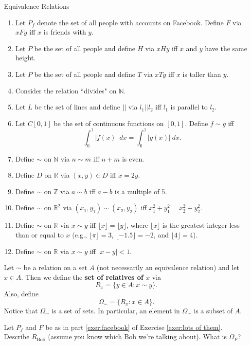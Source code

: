 \begin{section}{Equivalence Relations}
\begin{problem}
\begin{enumerate}\label{exer:lots of them}
\item\label{exer:facebook} Let $P_f$ denote the set of all people with accounts on Facebook.  Define  $F$ via $xFy$ iff $x$ is friends with $y$. 
\item Let $P$ be the set of all people and define $H$ via $xHy$ iff $x$ and $y$ have the same height.
\item Let $P$ be the set of all people and define $T$ via $xTy$ iff $x$ is taller than $y$.
\item Consider the relation ``divides" on $\mathbb{N}$.
\item Let $L$ be the set of lines and define $||$ via $l_1||l_2$ iff $l_1$ is parallel to $l_2$.
\item Let $C[0,1]$ be the set of continuous functions on $[0,1]$.  Define $f\sim g$ iff
\[
\int_0^1|f(x)|\ dx=\int_0^1|g(x)|\ dx.
\]
\item Define $\sim$ on $\mathbb{N}$ via $n\sim m$ iff $n+m$ is even.
\item Define $D$ on $\mathbb{R}$ via $(x,y)\in D$ iff $x=2y$.
\item\label{exer:mod 5} Define $\sim$ on $\mathbb{Z}$ via $a\sim b$ iff $a-b$ is a multiple of 5.
\item Define $\sim$ on $\mathbb{R}^2$ via $(x_1,y_1)\sim (x_2,y_2)$ iff $x_1^2+y_1^2=x_2^2+y_2^2$.
\item Define $\sim$ on $\mathbb{R}$ via $x\sim y$ iff $\lfloor x\rfloor =\lfloor y\rfloor$, where $\lfloor x\rfloor$ is the greatest integer less than or equal to $x$ (e.g., $\lfloor \pi\rfloor=3$, $\lfloor -1.5\rfloor=-2$, and $\lfloor 4\rfloor=4$).
\item Define $\sim$ on $\mathbb{R}$ via $x \sim y$ iff $|x-y|<1$.
\end{enumerate}
\end{problem}

\begin{definition}
Let $\sim$ be a relation on a set $A$ (not necessarily an equivalence relation) and let $x\in A$.  Then we define the \textbf{set of relatives of $x$} via
\[
R_x=\{y\in A: x\sim y\}.
\]
Also, define
\[
\Omega_{\sim}=\{R_x:x\in A\}.
\]
Notice that $\Omega_{\sim}$ is a set of sets.  In particular, an element in $\Omega_{\sim}$ is a subset of $A$.
\end{definition}

\begin{exercise}
Let $P_f$ and $F$ be as in part \ref{exer:facebook} of Exercise \ref{exer:lots of them}.  Describe $R_{\text{Bob}}$ (assume you know which Bob we're talking about).  What is $\Omega_F$?
\end{exercise}


\end{section}
